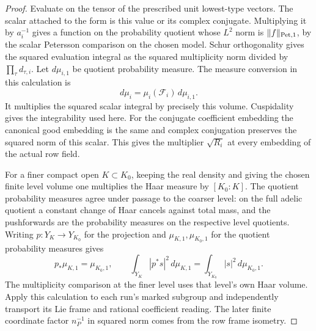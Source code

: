 \begin{proof}
Evaluate on the tensor of the prescribed unit
lowest-type vectors. The scalar attached to the form is this value or its complex conjugate. Multiplying it by \(a_i^{-1}\)
gives a function on the probability quotient whose \(L^2\)
norm is \(\|f\|_{{\rm Pet},1}\), by the scalar Petersson
comparison on the chosen model. Schur orthogonality gives
the squared evaluation integral as the squared multiplicity
norm divided by \(\prod_\tau d_{\tau,i}\). Let \(d\mu_{i,1}\) be quotient probability measure. The measure
conversion in this calculation is
\[
        d\mu_i=\mu_i(\mathcal F_i)\,d\mu_{i,1}.
\]
It multiplies the squared scalar integral by precisely this volume. Cuspidality gives
the integrability used here. For the conjugate coefficient
embedding the canonical good embedding is the same and
complex conjugation preserves the squared norm of this scalar. This gives the multiplier \(\sqrt{R_i}\) at every
embedding of the actual row field.
\label{cor:covolume-component-transfer-18}

For a finer compact open \(K\subset K_0\), keeping the real
density and giving the chosen finite level volume one
multiplies the Haar measure by \([K_0:K]\). The quotient
probability measures agree under passage to the coarser
level: on the full adelic quotient a constant change of
Haar cancels against total mass, and the pushforwards are
the probability measures on the respective level quotients.
Writing \(p:Y_K\to Y_{K_0}\) for the projection and
\(\mu_{K,1},\mu_{K_0,1}\) for the quotient probability measures gives
\[
 p_*\mu_{K,1}=\mu_{K_0,1},\qquad
 \int_{Y_K}|p^*s|^2\,d\mu_{K,1}
    =\int_{Y_{K_0}}|s|^2\,d\mu_{K_0,1}.
\] The multiplicity comparison at
the finer level uses that level's own Haar volume. Apply this
calculation to each run's marked subgroup and independently
transport its Lie frame and rational coefficient reading.
The later finite coordinate factor \(n_P^{-1}\) in squared
norm comes from the row frame isometry.

\end{proof}

